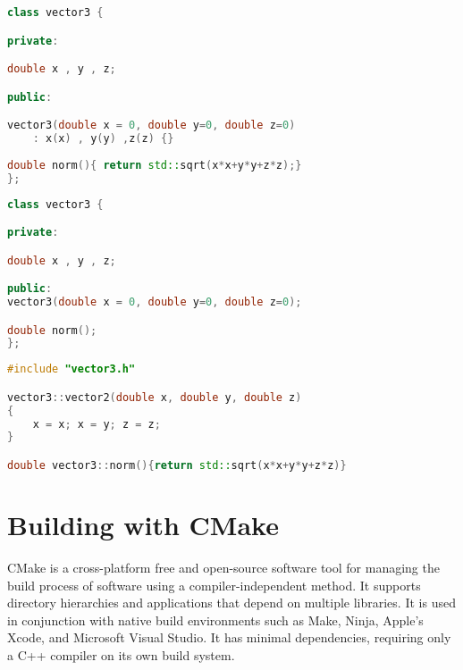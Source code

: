 \begin{lstlisting}[language=c++,caption={Example for a class definition.\label{code:class:definition}},float,floatplacement=tb]
class vector3 {

private:

double x , y , z;

public:

vector3(double x = 0, double y=0, double z=0)
    : x(x) , y(y) ,z(z) {}
    
double norm(){ return std::sqrt(x*x+y*y+z*z);}
};
\end{lstlisting}


\begin{lstlisting}[language=c++,caption={Corresponding header file to the class definition in Listing~\ref{code:class:definition}.\label{code:header:definition}},float,floatplacement=tb]
class vector3 {

private:

double x , y , z;

public:
vector3(double x = 0, double y=0, double z=0);

double norm();
};

\end{lstlisting}

\begin{lstlisting}[language=c++,caption={Corresponding class file to the class definition in Listing~\ref{code:class:definition}.\label{code:class:definition2}},float,floatplacement=tb]
#include "vector3.h"

vector3::vector2(double x, double y, double z)
{
    x = x; x = y; z = z;
}

double vector3::norm(){return std::sqrt(x*x+y*y+z*z)}
\end{lstlisting}


\section{Building with CMake}
\label{sec:cmake}
CMake is a cross-platform free and open-source software tool for managing the build process of software using a compiler-independent method. It supports directory hierarchies and applications that depend on multiple libraries. It is used in conjunction with native build environments such as Make, Ninja, Apple's Xcode, and Microsoft Visual Studio. It has minimal dependencies, requiring only a C++ compiler on its own build system. \\

